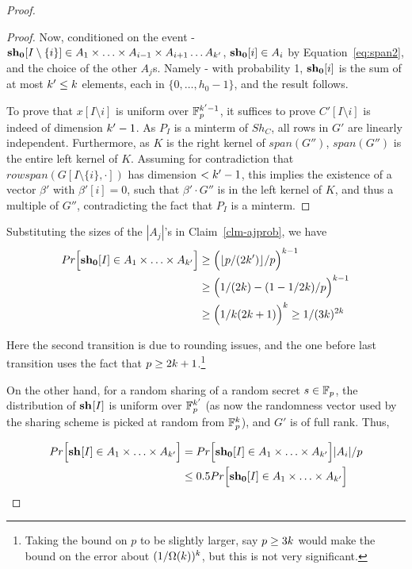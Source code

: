 \begin{proof}
\begin{proof}
Now, conditioned on the event - $\mathbf{sh_{0}}[I\setminus\{i\}]\in A_1\times \ldots\times A_{i-1}\times A_{i+1}\ldots A_{k'}$, $\mathbf{sh_{0}}[i]\in A_i$ by Equation~\ref{eq:span2}, and the choice of the other $A_j$s.
Namely - with probability 1, $\mathbf{sh_{0}}[i]$ is the sum of at most $k'\leq k$ elements, each in $\{0,\ldots,h_0-1\}$, and the result follows.

To prove that $x[I\setminus{i}]$ is uniform over $\mathbb{F}^{k'-1}_p$, it suffices to prove $C'[I\setminus{i}]$ is indeed of dimension $k'-1$.
As $P_I$ is a minterm of $Sh_C$, all rows in $G'$ are linearly independent. Furthermore, as $K$ is the right kernel of $span(G'')$, $span(G'')$ is the entire left kernel of $K$. Assuming for contradiction that $rowspan(G[I\setminus{\{i\}},\cdot])$ has dimension $<k'-1$, this implies the existence of a vector $\beta'$ with $\beta'[i]=0$, such that $\beta'\cdot G''$ is in the left kernel of $K$, and thus a multiple of 
$G''$, contradicting the fact that $P_I$ is a minterm.
\end{proof}

Substituting the sizes of the $|A_j|$'s in Claim~\ref{clm-ajprob}, we have
\begin{align}\label{eq:s0}
Pr\Big[\mathbf{sh_{0}}[I]\in A_1\times \ldots\times A_{k'}\Big] &\geq \Big(\lfloor p/(2k')\rfloor/p\Big)^{k-1} \\ 
&\geq \Big(1/(2k)-(1-1/2k)/p\Big)^{k-1} \nonumber\\
&\geq \Big(1/k(2k+1)\Big)^{k}\geq 1/(3k)^{2k} \nonumber
\end{align}

Here the second transition is due to rounding issues, and the one before last transition uses the fact that $p\geq 2k+1$.\footnote{Taking the bound on $p$ to be slightly larger, say $p\geq 3k$ would make the bound on the error about $(1/\Omega(k))^k$, but this is not very significant.} 

On the other hand, for a random sharing of a random secret $s \in \mathbb{F}_p$, the distribution of 
$\mathbf{sh_{}}[I]$ is uniform over $\mathbb{F}^{k'}_p$ (as now the randomness vector used by the sharing scheme is picked at random from $\mathbb{F}^k_p$), and $G'$ is of full rank. Thus, 

\begin{align}
 Pr\Big[\mathbf{sh_{}}[I]\in A_1\times \ldots\times A_{k'} \Big] &= Pr\Big[\mathbf{sh_{0}}[I]\in A_1\times \ldots\times A_{k'}\Big]|A_i|/p \nonumber \\
 &\leq 0.5 Pr\Big[\mathbf{sh_{0}}[I]\in A_1\times \ldots\times A_{k'}\Big] \nonumber
\end{align}



\end{proof}
